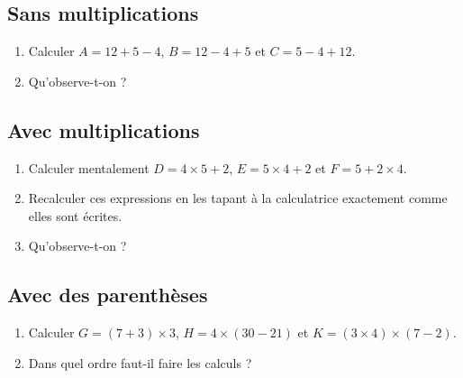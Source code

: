 
\subsection*{Sans multiplications}

\begin{enumerate}
    \item
Calculer \( A=12+5-4\), \( B=12-4+5\) et \( C=5-4+12\).
\item
    Qu'observe-t-on ?
\end{enumerate}

\subsection*{Avec multiplications}

\begin{enumerate}
    \item
        Calculer mentalement \( D=4\times 5+2\), \( E=5\times 4+2\) et \( F=5+2\times 4\).
    \item
        Recalculer ces expressions en les tapant à la calculatrice exactement comme elles sont écrites.
    \item
        Qu'observe-t-on ?
\end{enumerate}

\subsection*{Avec des parenthèses}

\begin{enumerate}
    \item
        Calculer \( G=(7+3)\times 3\), \( H=4\times (30-21)\) et \( K=(3\times 4)\times (7-2)\).
    \item
        Dans quel ordre faut-il faire les calculs ?
\end{enumerate}
